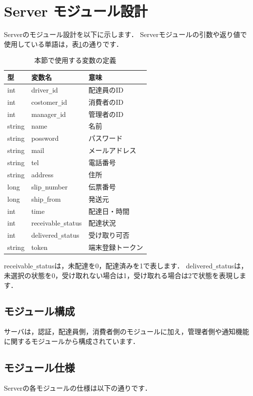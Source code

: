 \documentclass[a4j,titlepage]{jarticle}
\begin{document}
\section{Server モジュール設計}
Serverのモジュール設計を以下に示します．
Serverモジュールの引数や返り値で使用している単語は，表\ref{serverTable}の通りです．
\begin{table}[htb]
\centering
\caption{本節で使用する変数の定義}
\label{serverTable}
\begin{tabular}{|lll|}
\hline
型 & 変数名 & 意味      \\ \hline
int & driver\verb|_|id & 配達員のID     \\
int & costomer\verb|_|id & 消費者のID     \\
int & manager\verb|_|id & 管理者のID     \\
string  & name  & 名前     \\
string & possword & パスワード     \\
string & mail & メールアドレス     \\
string & tel & 電話番号     \\
string & address & 住所     \\
long  &  slip\verb|_|number  & 伝票番号   \\
long & ship\verb|_|from & 発送元     \\
int & time & 配達日・時間     \\
int & receivable\verb|_|status & 配達状況    \\
int & delivered\verb|_|status  &  受け取り可否  \\
string & token & 端末登録トークン \\ \hline
\end{tabular}
\end{table}
receivable\verb|_|statusは，未配達を0，配達済みを1で表します．
delivered\verb|_|statusは，未選択の状態を0，受け取れない場合は1，受け取れる場合は2で状態を表現します．

\subsection{モジュール構成}
サーバは，認証，配達員側，消費者側のモジュールに加え，管理者側や通知機能に関するモジュールから構成されています．

\subsection{モジュール仕様}
Serverの各モジュールの仕様は以下の通りです．
\end{document}
